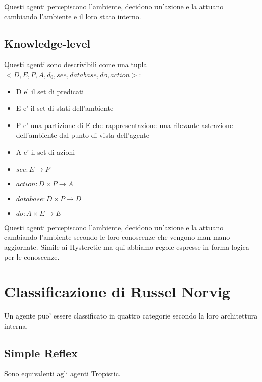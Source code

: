 Questi agenti percepiscono l'ambiente, decidono un'azione e la attuano cambiando l'ambiente e il loro stato interno.


\subsection{Knowledge-level}

Questi agenti sono descrivibili come una tupla $<D, E, P, A, d_0, see, database, do, action>$:

\begin{itemize}
  \item D e' il set di predicati
  \item E e' il set di stati dell'ambiente
  \item P e' una partizione di E che rappresentazione una rilevante astrazione dell'ambiente dal punto di vista dell'agente
  \item A e' il set di azioni
  \item $see : E \rightarrow P$
  \item $action : D \times P \rightarrow A$
  \item $database : D \times P \rightarrow D$
  \item $do : A \times E \rightarrow E$
\end{itemize}

Questi agenti percepiscono l'ambiente, decidono un'azione e la attuano cambiando l'ambiente secondo le loro conoscenze che vengono man mano aggiornate.
Simile ai Hysteretic ma qui abbiamo regole espresse in forma logica per le conoscenze.


\section{Classificazione di Russel Norvig}

Un agente puo' essere classificato in quattro categorie secondo la loro architettura interna.

\subsection{Simple Reflex}

Sono equivalenti agli agenti Tropistic.


